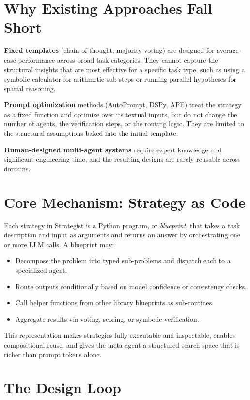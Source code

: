 \documentclass[10pt,twocolumn]{article}
\begin{document}
\section{Why Existing Approaches Fall Short}

\textbf{Fixed templates} (chain-of-thought, majority voting) are designed
for average-case performance across broad task categories. They cannot
capture the structural insights that are most effective for a specific
task type, such as using a symbolic calculator for arithmetic sub-steps
or running parallel hypotheses for spatial reasoning.

\textbf{Prompt optimization} methods (AutoPrompt, DSPy, APE) treat the
strategy as a fixed function and optimize over its textual inputs, but
do not change the number of agents, the verification steps, or the
routing logic. They are limited to the structural assumptions baked into
the initial template.

\textbf{Human-designed multi-agent systems} require expert knowledge and
significant engineering time, and the resulting designs are rarely
reusable across domains.

\section{Core Mechanism: Strategy as Code}

Each strategy in Strategist is a Python program, or \emph{blueprint},
that takes a task description and input as arguments and returns an
answer by orchestrating one or more LLM calls. A blueprint may:
\begin{itemize}[itemsep=2pt,parsep=0pt]
  \item Decompose the problem into typed sub-problems and dispatch each
    to a specialized agent.
  \item Route outputs conditionally based on model confidence or
    consistency checks.
  \item Call helper functions from other library blueprints as
    sub-routines.
  \item Aggregate results via voting, scoring, or symbolic verification.
\end{itemize}

This representation makes strategies fully executable and inspectable,
enables compositional reuse, and gives the meta-agent a structured
search space that is richer than prompt tokens alone.

\section{The Design Loop}
\end{document}

